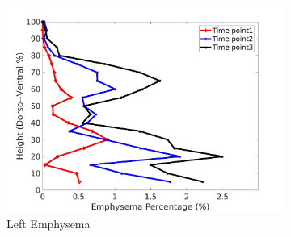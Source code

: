 \begin{figure}[H]
\begin{subfigure}{.42\linewidth}
  \includegraphics[width=\linewidth,trim={{.0\wd0} {.0\wd0} {.0\wd0} {.0\wd0}},clip]{Appendix/Image_AppexA/DorsoToVentral/IPF21LeftLungEmphysemaDiseaseDorsoToVentral.jpg} %
  \caption{Left Emphysema}
  \label{fig:IPF21DiseaseDorsoToVentral-g} 
\end{subfigure} 
\begin{subfigure}{.42\linewidth}%

\end{subfigure}
\end{figure}
